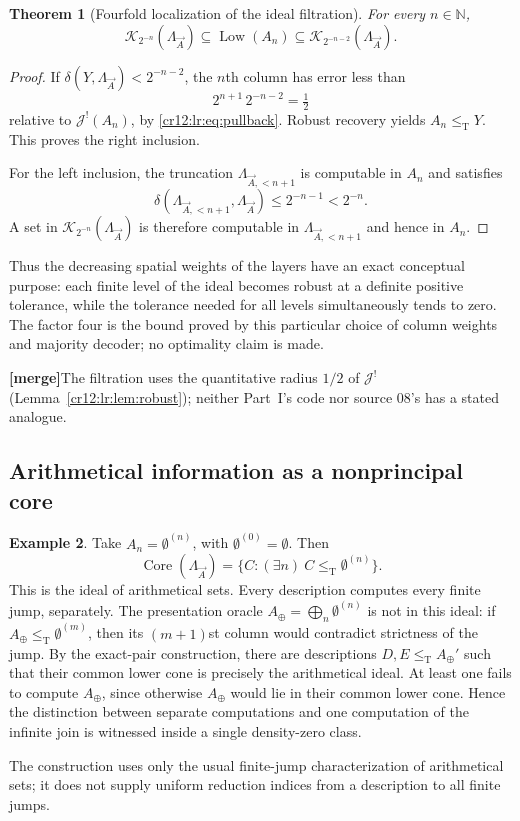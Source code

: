 \documentclass[11pt,letterpaper]{article}
\theoremstyle{plain}
\newtheorem{theorem}{Theorem}[section]
\theoremstyle{definition}
\newtheorem{example}[theorem]{Example}
\theoremstyle{remark}
\numberwithin{equation}{section}
\newcommand{\N}{\mathbb N}
\newcommand{\leT}{\leq_{\mathrm T}}
\newcommand{\Core}{\operatorname{Core}}
\newcommand{\Low}{\operatorname{Low}}
\newcommand{\mergenote}[1]{\par\smallskip\noindent
 {\small\textsf{\textbf{[merge]}}\enspace #1}\par\smallskip}
\newcommand{\Aplus}{A_{\oplus}}          %
\newcommand{\Jfac}{\mathcal J^{!}}       %
\newcommand{\Lam}{\Lambda_{\vec A}}      %
\begin{document}
\begin{theorem}[Fourfold localization of the ideal filtration]\label{cr12:lr:thm:filtration}
For every $n\in\N$,
\begin{equation}\label{cr12:lr:eq:sandwich}
 \mathcal K_{2^{-n}}(\Lam)
 \subseteq\Low(A_n)
 \subseteq\mathcal K_{2^{-n-2}}(\Lam).
\end{equation}
\end{theorem}
\begin{proof}
If $\delta(Y,\Lam)<2^{-n-2}$, the $n$th column has error less than
\[
 2^{n+1}\,2^{-n-2}=\tfrac12
\]
relative to $\Jfac(A_n)$, by \eqref{cr12:lr:eq:pullback}. Robust recovery yields
$A_n\leT Y$. This proves the right inclusion.

For the left inclusion, the truncation $\Lambda_{\vec A,<n+1}$ is computable in $A_n$ and
satisfies
\[
 \delta(\Lambda_{\vec A,<n+1},\Lam)\leq2^{-n-1}<2^{-n}.
\]
A set in $\mathcal K_{2^{-n}}(\Lam)$ is therefore computable in $\Lambda_{\vec A,<n+1}$ and hence
in $A_n$.
\end{proof}

Thus the decreasing spatial weights of the layers have an exact conceptual purpose:
each finite level of the ideal becomes robust at a definite positive tolerance, while
the tolerance needed for all levels simultaneously tends to zero. The factor four is
the bound proved by this particular choice of column weights and majority decoder; no
optimality claim is made.

\mergenote{The filtration uses the quantitative radius $1/2$ of $\Jfac$
(Lemma~\ref{cr12:lr:lem:robust}); neither Part~I's code nor source 08's has a stated
analogue.}

\subsection{Arithmetical information as a nonprincipal core}
\begin{example}\label{cr12:lr:ex:arith}
Take $A_n=\emptyset^{(n)}$, with $\emptyset^{(0)}=\emptyset$. Then
\[
 \Core(\Lam)=\{C:(\exists n)\ C\leT\emptyset^{(n)}\}.
\]
This is the ideal of arithmetical sets. Every description computes every finite jump,
separately. The presentation oracle $\Aplus=\bigoplus_n\emptyset^{(n)}$ is not in this
ideal: if $\Aplus\leT\emptyset^{(m)}$, then its $(m+1)$st column would contradict
strictness of the jump. By the exact-pair construction, there are descriptions
$D,E\leT \Aplus'$ such that their common lower cone is precisely the arithmetical
ideal. At least one fails to compute $\Aplus$, since otherwise $\Aplus$ would lie in
their common lower cone. Hence the distinction between separate computations and one
computation of the infinite join is witnessed inside a single density-zero class.
\end{example}
The construction uses only the usual finite-jump characterization of arithmetical
sets; it does not supply uniform reduction indices from a description to all finite
jumps.
\end{document}
